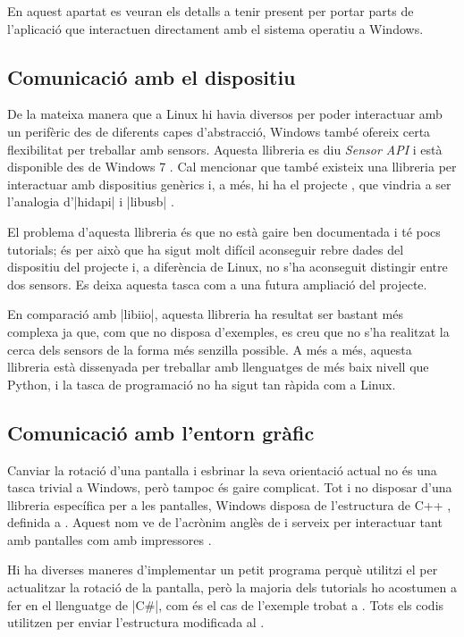 En aquest apartat es veuran els detalls a tenir present per portar parts
de l'aplicació que interactuen directament amb el sistema operatiu a Windows.

\subsection{Comunicació amb el dispositiu}

De la mateixa manera que a Linux hi havia diversos  per poder
interactuar amb un perifèric des de diferents capes d'abstracció, Windows també
ofereix certa flexibilitat per treballar amb sensors. Aquesta llibreria es diu
\emph{Sensor API} i està disponible des de Windows 7 \cite{SensorMsft}.
Cal mencionar que també existeix una llibreria per interactuar amb dispositius
 genèrics i, a més, hi ha el projecte , que
vindria a ser l'analogia d'\ord|hidapi| i \ord|libusb| \cite{SensorHidMsft}.

El problema d'aquesta llibreria és que no està gaire ben documentada i té pocs
tutorials; és per això que ha sigut molt difícil aconseguir rebre dades del
dispositiu del projecte i, a diferència de Linux, no s'ha aconseguit distingir
entre dos sensors. Es deixa aquesta tasca com a una futura ampliació del projecte.

En comparació amb \ord|libiio|, aquesta llibreria ha resultat ser bastant més
complexa ja que, com que no disposa d'exemples, es creu que no s'ha realitzat
la cerca dels sensors de la forma més senzilla possible. A més a més,
aquesta llibreria està dissenyada per treballar amb llenguatges de més baix
nivell que Python, i la tasca de programació no ha sigut tan ràpida com a Linux.

\subsection{Comunicació amb l'entorn gràfic}

Canviar la rotació d'una pantalla i esbrinar la seva orientació actual no és una
tasca trivial a Windows, però tampoc és gaire complicat.
Tot i no disposar d'una llibreria específica per a les pantalles, Windows
disposa de l'estructura de C++ , definida a .
Aquest nom ve de l'acrònim anglès de  i serveix per
interactuar tant amb pantalles com amb impressores \cite{WinDevMode}.

Hi ha diverses maneres d'implementar un petit programa perquè utilitzi el
 per actualitzar la rotació de la pantalla, però la majoria
dels tutorials ho acostumen a fer en el llenguatge de \ord|C#|, com és el cas
de l'exemple trobat a \cite{WinRotateOnline}. Tots els codis utilitzen
 per enviar l'estructura modificada al .

